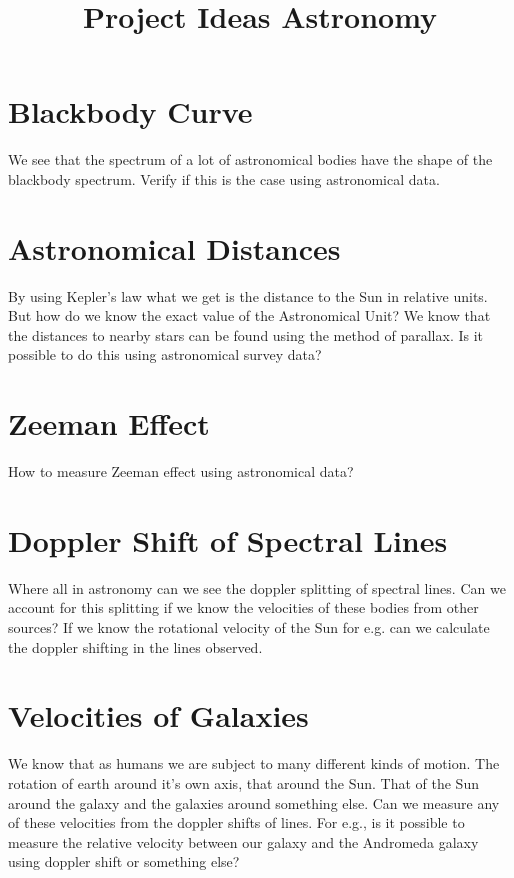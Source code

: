 \documentclass{../template/texnote}
\title{Project Ideas Astronomy}
\begin{document}
    \maketitle {}
	\section{Blackbody Curve}
We see that the spectrum of a lot of astronomical bodies have the shape of the
blackbody spectrum. Verify if this is the case using astronomical data.

\section{Astronomical Distances}
By using Kepler’s law what we get is the distance to the Sun in relative units.
But how do we know the exact value of the Astronomical Unit?
We know that the distances to nearby stars can be found using the method
of parallax. Is it possible to do this using astronomical survey data?

\section{Zeeman Effect}
How to measure Zeeman effect using astronomical data?

\section{Doppler Shift of Spectral Lines}
Where all in astronomy can we see the doppler splitting of spectral lines. Can
we account for this splitting if we know the velocities of these bodies from other
sources? If we know the rotational velocity of the Sun for e.g. can we calculate
the doppler shifting in the lines observed.

\section{Velocities of Galaxies}
We know that as humans we are subject to many different kinds of motion. The
rotation of earth around it’s own axis, that around the Sun. That of the Sun
around the galaxy and the galaxies around something else. Can we measure
any of these velocities from the doppler shifts of lines. For e.g., is it possible
to measure the relative velocity between our galaxy and the Andromeda galaxy
using doppler shift or something else?

    \printbibliography
\end{document}
